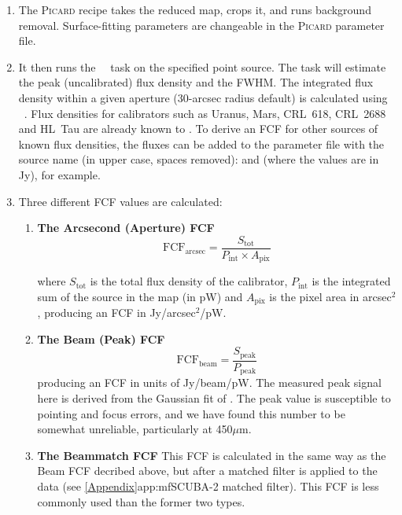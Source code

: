 \begin{enumerate}
\item The \textsc{Picard} recipe  takes the
  reduced map, crops it, and runs background removal. Surface-fitting
  parameters are changeable in the \textsc{Picard} parameter file.

\item It then runs the \Kappa\ \beamfit\ task on the specified point
  source. The  task will estimate the peak
  (uncalibrated) flux density and the FWHM. The integrated flux
  density within a given aperture (30-arcsec radius default) is
  calculated using \photom\ \autophotom. Flux densities for
  calibrators such as Uranus, Mars, CRL~618, CRL~2688 and HL~Tau are
  already known to \picard. To derive an FCF for other sources of
  known flux densities, the fluxes can be added to the parameter file
  with the source name (in upper case, spaces
  removed): 
  and  (where the values are in Jy),
  for example.

\item Three different FCF values are calculated:

  \begin{enumerate}

  \item \textbf{The Arcsecond (Aperture) FCF}
    \begin{equation}
      \label{eq:fcf_arcsec}
      \mathrm{FCF_{arcsec}} = \frac{S_{\mathrm{tot}}}{P_{\mathrm{int}} \times
        A_{\mathrm{pix}}}
    \end{equation}

    where $S_{\mathrm{tot}}$ is the total flux density of the
    calibrator, $P_{\mathrm{int}}$ is the integrated sum of the source
    in the map (in pW) and $A_{\mathrm{pix}}$ is the pixel area in
    arcsec$^2$, producing an FCF in Jy/arcsec$^2$/pW.

   \vspace{3mm}

  \item\textbf{The Beam (Peak) FCF}
    \begin{equation}
      \label{eq:fcf_beam}
      \mathrm{FCF_{beam}} = \frac{S_{\mathrm{peak}}}{P_{\mathrm{peak}}}
    \end{equation}
    producing an FCF in units of Jy/beam/pW. The measured peak signal here is
    derived from the Gaussian fit of . The peak value is susceptible
    to pointing and focus errors, and we have found this number to be somewhat unreliable,
    particularly at 450$\mu$m.

   \vspace{3mm}

  \item\textbf{The Beammatch FCF}
    This FCF is calculated in the same way as the Beam FCF decribed
    above, but after a matched filter is applied to the data (see
    \cref{Appendix}{app:mf}{SCUBA-2 matched filter}).
    This FCF is less commonly used than the former two types.

  \end{enumerate}

\end{enumerate}

